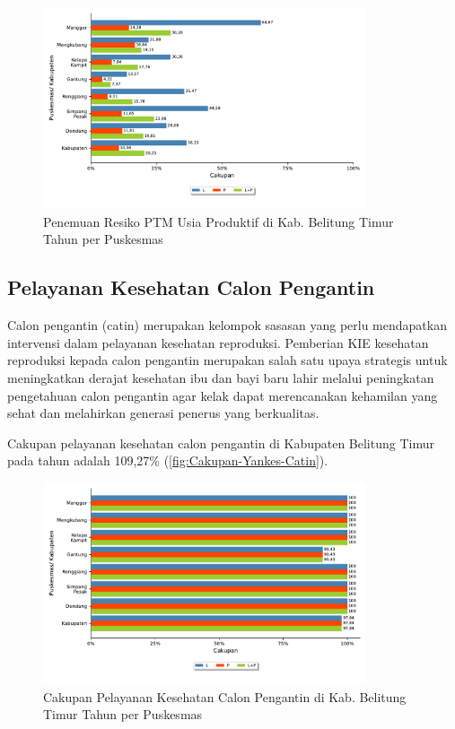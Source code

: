 \begin{figure}[H]
    \centering
    \includegraphics[width=0.85\textwidth]{bab_05/bab_05_28_skriningProduktif_b}
    \caption{Penemuan Resiko PTM Usia Produktif di Kab. Belitung Timur Tahun \tP per Puskesmas}
    \label{fig:Cakupan-Resiko-PTM-Usprod}
\end{figure}

\subsection{Pelayanan Kesehatan Calon Pengantin}
Calon pengantin (catin) merupakan kelompok sasasan yang perlu mendapatkan intervensi dalam pelayanan kesehatan reproduksi.
Pemberian KIE kesehatan reproduksi kepada calon pengantin merupakan salah satu upaya strategis untuk meningkatkan derajat kesehatan ibu dan bayi baru lahir melalui peningkatan pengetahuan calon pengantin agar kelak dapat merencanakan kehamilan yang sehat dan melahirkan generasi penerus yang berkualitas.

Cakupan pelayanan kesehatan calon pengantin di Kabupaten Belitung Timur pada tahun \tP adalah 109,27\% (\autoref{fig:Cakupan-Yankes-Catin}).

\begin{figure}[H]
	\centering
	\includegraphics[width=0.85\textwidth]{bab_05/bab_05_29a_pelayananCatin}
	\caption{Cakupan Pelayanan Kesehatan Calon Pengantin di Kab. Belitung Timur Tahun \tP per Puskesmas}
	\label{fig:Cakupan-Yankes-Catin}
\end{figure}

